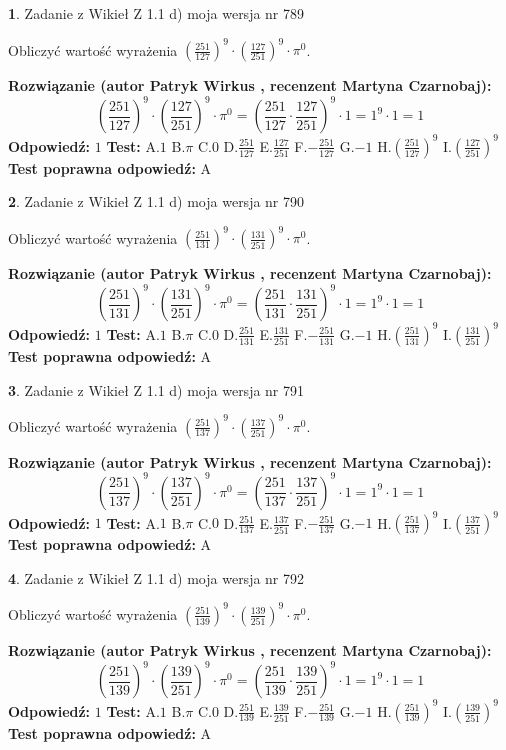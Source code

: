 \documentclass[12pt, a4paper]{article}
\theoremstyle{definition} %
\newtheorem{zad}{}
\newcommand{\zadStart}[1]{\begin{zad}#1\newline}
\newcommand{\zadStop}{\end{zad}}
\newcommand{\rozwStart}[2]{\noindent \textbf{Rozwiązanie (autor #1 , recenzent #2): }\newline}
\newcommand{\rozwStop}{\newline}
\newcommand{\odpStart}{\noindent \textbf{Odpowiedź:}\newline}
\newcommand{\odpStop}{\newline}
\newcommand{\testStart}{\noindent \textbf{Test:}\newline}
\newcommand{\testStop}{\newline}
\newcommand{\kluczStart}{\noindent \textbf{Test poprawna odpowiedź:}\newline}
\newcommand{\kluczStop}{\newline}
\begin{document}
\zadStart{Zadanie z Wikieł Z 1.1 d) moja wersja nr 789}

Obliczyć wartość wyrażenia $(\frac{251}{127})^{9} \cdot (\frac{127}{251})^{9} \cdot \pi^{0}$.
\zadStop
\rozwStart{Patryk Wirkus}{Martyna Czarnobaj}
$$(\frac{251}{127})^{9} \cdot (\frac{127}{251})^{9} \cdot \pi^{0} = (\frac{251}{127} \cdot \frac{127}{251})^{9} \cdot 1 = 1^{9} \cdot 1 = 1$$
\rozwStop
\odpStart
$1$
\odpStop
\testStart
A.$1$ B.$\pi$ C.$0$ D.$\frac{251}{127}$ E.$\frac{127}{251}$
F.$-\frac{251}{127}$ G.$-1$
H.$(\frac{251}{127})^{9}$
I.$(\frac{127}{251})^{9}$
\testStop
\kluczStart
A
\kluczStop



\zadStart{Zadanie z Wikieł Z 1.1 d) moja wersja nr 790}

Obliczyć wartość wyrażenia $(\frac{251}{131})^{9} \cdot (\frac{131}{251})^{9} \cdot \pi^{0}$.
\zadStop
\rozwStart{Patryk Wirkus}{Martyna Czarnobaj}
$$(\frac{251}{131})^{9} \cdot (\frac{131}{251})^{9} \cdot \pi^{0} = (\frac{251}{131} \cdot \frac{131}{251})^{9} \cdot 1 = 1^{9} \cdot 1 = 1$$
\rozwStop
\odpStart
$1$
\odpStop
\testStart
A.$1$ B.$\pi$ C.$0$ D.$\frac{251}{131}$ E.$\frac{131}{251}$
F.$-\frac{251}{131}$ G.$-1$
H.$(\frac{251}{131})^{9}$
I.$(\frac{131}{251})^{9}$
\testStop
\kluczStart
A
\kluczStop



\zadStart{Zadanie z Wikieł Z 1.1 d) moja wersja nr 791}

Obliczyć wartość wyrażenia $(\frac{251}{137})^{9} \cdot (\frac{137}{251})^{9} \cdot \pi^{0}$.
\zadStop
\rozwStart{Patryk Wirkus}{Martyna Czarnobaj}
$$(\frac{251}{137})^{9} \cdot (\frac{137}{251})^{9} \cdot \pi^{0} = (\frac{251}{137} \cdot \frac{137}{251})^{9} \cdot 1 = 1^{9} \cdot 1 = 1$$
\rozwStop
\odpStart
$1$
\odpStop
\testStart
A.$1$ B.$\pi$ C.$0$ D.$\frac{251}{137}$ E.$\frac{137}{251}$
F.$-\frac{251}{137}$ G.$-1$
H.$(\frac{251}{137})^{9}$
I.$(\frac{137}{251})^{9}$
\testStop
\kluczStart
A
\kluczStop



\zadStart{Zadanie z Wikieł Z 1.1 d) moja wersja nr 792}

Obliczyć wartość wyrażenia $(\frac{251}{139})^{9} \cdot (\frac{139}{251})^{9} \cdot \pi^{0}$.
\zadStop
\rozwStart{Patryk Wirkus}{Martyna Czarnobaj}
$$(\frac{251}{139})^{9} \cdot (\frac{139}{251})^{9} \cdot \pi^{0} = (\frac{251}{139} \cdot \frac{139}{251})^{9} \cdot 1 = 1^{9} \cdot 1 = 1$$
\rozwStop
\odpStart
$1$
\odpStop
\testStart
A.$1$ B.$\pi$ C.$0$ D.$\frac{251}{139}$ E.$\frac{139}{251}$
F.$-\frac{251}{139}$ G.$-1$
H.$(\frac{251}{139})^{9}$
I.$(\frac{139}{251})^{9}$
\testStop
\kluczStart
A
\kluczStop
\end{document}
